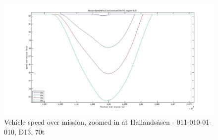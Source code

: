 \documentclass[ExampleMasters.tex]{subfiles}
\begin{document}
\begin{figure}
\centering
\includegraphics[width=\linewidth]{figures/ModelValidation/PlotsWithPredictiveControl/EngineSizeAndGCW/MissionSpeedZoomedInD13.jpg}
\caption{Vehicle speed over mission, zoomed in at Hallands\aa sen - 011-010-01-010, D13, 70t}
\label{speedZoomedEngineDownsizingPredictiveSoC}
\end{figure}
\end{document}
